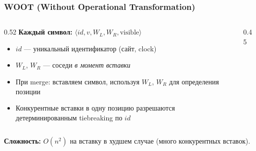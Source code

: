 \documentclass{beamer}
\begin{document}
\begin{frame}
\frametitle{WOOT (Without Operational Transformation)}

\begin{columns}
\begin{column}{0.52\textwidth}
\textbf{Каждый символ:} $\langle id, v, W_L, W_R, \text{visible}\rangle$
\begin{itemize}
  \item $id$ — уникальный идентификатор (сайт, clock)
  \item $W_L$, $W_R$ — соседи \emph{в момент вставки}
  \item При merge: вставляем символ, используя $W_L$, $W_R$ для определения позиции
  \item Конкурентные вставки в одну позицию разрешаются детерминированным tiebreaking по $id$
\end{itemize}
\end{column}
\begin{column}{0.45\textwidth}
\end{column}
\end{columns}

\textbf{Сложность:} $O(n^2)$ на вставку в худшем случае (много конкурентных вставок).

\end{frame}
\end{document}

